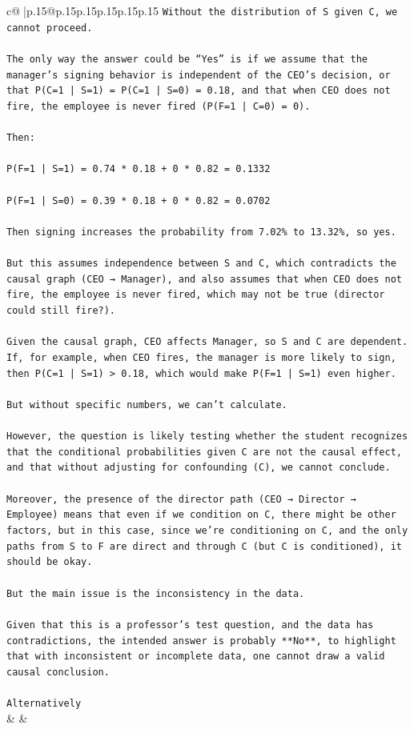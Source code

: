 \documentclass{article}
\begin{document}
{\begin{supertabular}{c@{$\;$}|p{.15\linewidth}@{}p{.15\linewidth}p{.15\linewidth}p{.15\linewidth}p{.15\linewidth}p{.15\linewidth}}
{{{\texttt{Without the distribution of S given C, we cannot proceed.} \\
\\ 
\texttt{The only way the answer could be “Yes” is if we assume that the manager’s signing behavior is independent of the CEO’s decision, or that P(C=1 | S=1) = P(C=1 | S=0) = 0.18, and that when CEO does not fire, the employee is never fired (P(F=1 | C=0) = 0).} \\
\\ 
\texttt{Then:} \\
\\ 
\texttt{P(F=1 | S=1) = 0.74 * 0.18 + 0 * 0.82 = 0.1332} \\
\\ 
\texttt{P(F=1 | S=0) = 0.39 * 0.18 + 0 * 0.82 = 0.0702} \\
\\ 
\texttt{Then signing increases the probability from 7.02\% to 13.32\%, so yes.} \\
\\ 
\texttt{But this assumes independence between S and C, which contradicts the causal graph (CEO → Manager), and also assumes that when CEO does not fire, the employee is never fired, which may not be true (director could still fire?).} \\
\\ 
\texttt{Given the causal graph, CEO affects Manager, so S and C are dependent. If, for example, when CEO fires, the manager is more likely to sign, then P(C=1 | S=1) > 0.18, which would make P(F=1 | S=1) even higher.} \\
\\ 
\texttt{But without specific numbers, we can’t calculate.} \\
\\ 
\texttt{However, the question is likely testing whether the student recognizes that the conditional probabilities given C are not the causal effect, and that without adjusting for confounding (C), we cannot conclude.} \\
\\ 
\texttt{Moreover, the presence of the director path (CEO → Director → Employee) means that even if we condition on C, there might be other factors, but in this case, since we’re conditioning on C, and the only paths from S to F are direct and through C (but C is conditioned), it should be okay.} \\
\\ 
\texttt{But the main issue is the inconsistency in the data.} \\
\\ 
\texttt{Given that this is a professor’s test question, and the data has contradictions, the intended answer is probably **No**, to highlight that with inconsistent or incomplete data, one cannot draw a valid causal conclusion.} \\
\\ 
\texttt{Alternatively} \\
            }
        }
    }
    & & \\ \\


\end{supertabular}}
\end{document}
